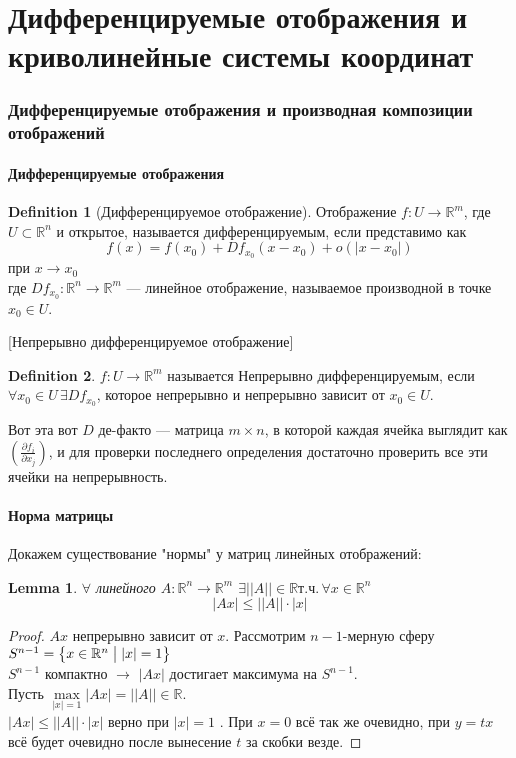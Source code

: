 \documentclass[a4paper,12pt]{article} %
\newtheorem{lemma}[theorem]{Lemma}
\theoremstyle{definition}
\newtheorem{definition}{Definition}[section]
\begin{document}
\part{Дифференцируемые отображения и криволинейные системы координат}
\section{Дифференцируемые отображения и производная композиции отображений}
\subsection{Дифференцируемые отображения}
\begin{definition}[Дифференцируемое отображение]
	Отображение $f : U \rightarrow \mathbb{R}^m$, где $U \subset \mathbb{R}^n$ и открытое, называется дифференцируемым, если представимо как 
	\begin{equation}
		f(x) = f(x_0) + D f_{x_0}(x - x_0) + o(|x - x_0|)
	\end{equation}
	при $x \rightarrow x_0$\\
	где $D f_{x_0} :  \mathbb{R}^n \rightarrow \mathbb{R}^m$ --- линейное отображение, называемое производной в точке $x_0 \in U$.
\end{definition}[Непрерывно дифференцируемое отображение]
\begin{definition}
	 $f : U \rightarrow \mathbb{R}^m$ называется Непрерывно дифференцируемым,  если $\forall x_0 \in U \, \exists D f_{x_0}$, которое непрерывно и непрерывно зависит от $x_0 \in U$.
\end{definition}
Вот эта вот $D$ де-факто --- матрица $m \times n$, в которой каждая ячейка выглядит как $ \left( \frac{\partial f_i}{\partial x_j} \right)$, и для проверки последнего определения достаточно проверить все эти ячейки на непрерывность.
\subsection{Норма матрицы}
Докажем существование "нормы" у матриц линейных отображений:
\begin{lemma}
	$\forall$ линейного $A : \mathbb{R}^n \rightarrow \mathbb{R}^m$ $\exists ||A|| \in \mathbb{R} т.ч. \, \forall x \in \mathbb{R}^n$
	\begin{equation}
		|Ax| \leq ||A|| \cdot |x|
	\end{equation}
\end{lemma}
\begin{proof}
	$Ax$ непрерывно зависит от $x$. Рассмотрим $n-1$-мерную сферу $S^{n-1} = \bigl\{ x \in \mathbb{R}^n \bigm| |x| = 1 \bigl\}$ \\
	$S^{n-1}$ компактно $\rightarrow$ $|Ax|$ достигает максимума на $S^{n-1}$. \\
	Пусть $\max\limits_{|x| = 1} |Ax| = ||A||\in \mathbb{R}$.\\
	$|Ax| \leq ||A|| \cdot |x|$ верно при $|x| = 1$	. При $x = 0$ всё так же очевидно, при $y = tx$ всё будет очевидно после вынесение $t$ за скобки везде.
\end{proof}
\end{document}
